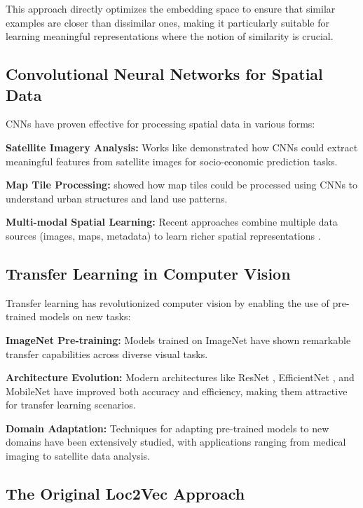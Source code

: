 This approach directly optimizes the embedding space to ensure that similar examples are closer than dissimilar ones, making it particularly suitable for learning meaningful representations where the notion of similarity is crucial.

\subsection{Convolutional Neural Networks for Spatial Data}

CNNs have proven effective for processing spatial data in various forms:

\textbf{Satellite Imagery Analysis:} Works like \cite{jean2016combining} demonstrated how CNNs could extract meaningful features from satellite images for socio-economic prediction tasks.

\textbf{Map Tile Processing:} \cite{zhou2018deeplearning} showed how map tiles could be processed using CNNs to understand urban structures and land use patterns.

\textbf{Multi-modal Spatial Learning:} Recent approaches combine multiple data sources (images, maps, metadata) to learn richer spatial representations \cite{multimodal2020}.

\subsection{Transfer Learning in Computer Vision}

Transfer learning has revolutionized computer vision by enabling the use of pre-trained models on new tasks:

\textbf{ImageNet Pre-training:} Models trained on ImageNet \cite{imagenet} have shown remarkable transfer capabilities across diverse visual tasks.

\textbf{Architecture Evolution:} Modern architectures like ResNet \cite{he2016resnet}, EfficientNet \cite{tan2019efficientnet}, and MobileNet \cite{howard2017mobilenets} have improved both accuracy and efficiency, making them attractive for transfer learning scenarios.

\textbf{Domain Adaptation:} Techniques for adapting pre-trained models to new domains have been extensively studied, with applications ranging from medical imaging to satellite data analysis.

\subsection{The Original Loc2Vec Approach}

